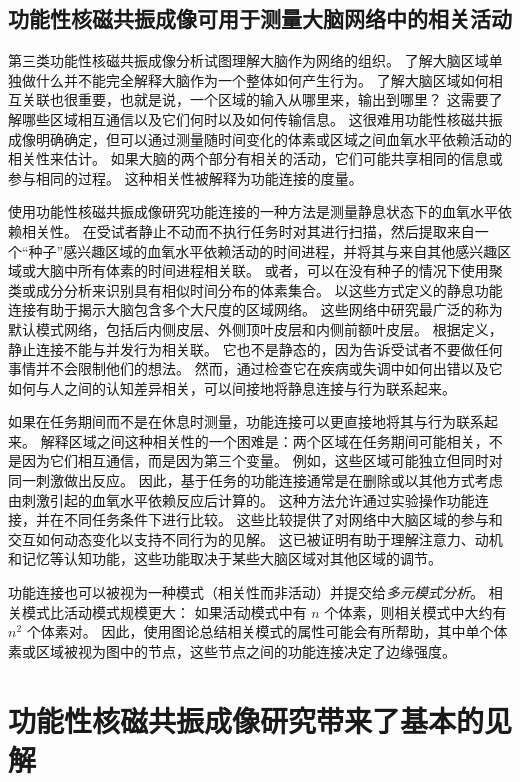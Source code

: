 \subsection{功能性核磁共振成像可用于测量大脑网络中的相关活动}

第三类功能性核磁共振成像分析试图理解大脑作为网络的组织。
了解大脑区域单独做什么并不能完全解释大脑作为一个整体如何产生行为。
了解大脑区域如何相互关联也很重要，也就是说，一个区域的输入从哪里来，输出到哪里？
这需要了解哪些区域相互通信以及它们何时以及如何传输信息。
这很难用功能性核磁共振成像明确确定，但可以通过测量随时间变化的体素或区域之间血氧水平依赖活动的相关性来估计。
如果大脑的两个部分有相关的活动，它们可能共享相同的信息或参与相同的过程。
这种相关性被解释为功能连接的度量。


使用功能性核磁共振成像研究功能连接的一种方法是测量静息状态下的血氧水平依赖相关性。 
在受试者静止不动而不执行任务时对其进行扫描，然后提取来自一个“种子”感兴趣区域的血氧水平依赖活动的时间进程，并将其与来自其他感兴趣区域或大脑中所有体素的时间进程相关联。
或者，可以在没有种子的情况下使用聚类或成分分析来识别具有相似时间分布的体素集合。
以这些方式定义的静息功能连接有助于揭示大脑包含多个大尺度的区域网络。
这些网络中研究最广泛的称为默认模式网络，包括后内侧皮层、外侧顶叶皮层和内侧前额叶皮层。
根据定义，静止连接不能与并发行为相关联。
它也不是静态的，因为告诉受试者不要做任何事情并不会限制他们的想法。
然而，通过检查它在疾病或失调中如何出错以及它如何与人之间的认知差异相关，可以间接地将静息连接与行为联系起来。


如果在任务期间而不是在休息时测量，功能连接可以更直接地将其与行为联系起来。
解释区域之间这种相关性的一个困难是：两个区域在任务期间可能相关，不是因为它们相互通信，而是因为第三个变量。
例如，这些区域可能独立但同时对同一刺激做出反应。
因此，基于任务的功能连接通常是在删除或以其他方式考虑由刺激引起的血氧水平依赖反应后计算的。
这种方法允许通过实验操作功能连接，并在不同任务条件下进行比较。
这些比较提供了对网络中大脑区域的参与和交互如何动态变化以支持不同行为的见解。
这已被证明有助于理解注意力、动机和记忆等认知功能，这些功能取决于某些大脑区域对其他区域的调节。


功能连接也可以被视为一种模式（相关性而非活动）并提交给\textit{多元模式分析}。 
相关模式比活动模式规模更大：
如果活动模式中有 $n$ 个体素，则相关模式中大约有 $n^2$ 个体素对。
因此，使用图论总结相关模式的属性可能会有所帮助，其中单个体素或区域被视为图中的节点，这些节点之间的功能连接决定了边缘强度。



\section{功能性核磁共振成像研究带来了基本的见解}

